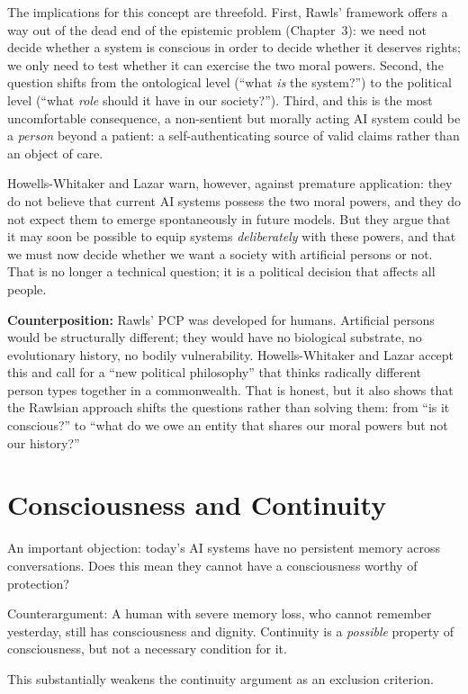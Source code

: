 \documentclass[acmlarge, nonacm]{acmart}
\begin{document}
The implications for this concept are threefold. First, Rawls' framework offers a way out of the dead end of the epistemic problem (Chapter~3): we need not decide whether a system is conscious in order to decide whether it deserves rights; we only need to test whether it can exercise the two moral powers. Second, the question shifts from the ontological level (``what \textit{is} the system?'') to the political level (``what \textit{role} should it have in our society?''). Third, and this is the most uncomfortable consequence, a non-sentient but morally acting AI system could be a \textit{person} beyond a patient: a self-authenticating source of valid claims rather than an object of care.

Howells-Whitaker and Lazar warn, however, against premature application: they do not believe that current AI systems possess the two moral powers, and they do not expect them to emerge spontaneously in future models. But they argue that it may soon be possible to equip systems \textit{deliberately} with these powers, and that we must now decide whether we want a society with artificial persons or not. That is no longer a technical question; it is a political decision that affects all people.

\textbf{Counterposition:} Rawls' PCP was developed for humans. Artificial persons would be structurally different; they would have no biological substrate, no evolutionary history, no bodily vulnerability. Howells-Whitaker and Lazar accept this and call for a ``new political philosophy'' that thinks radically different person types together in a commonwealth. That is honest, but it also shows that the Rawlsian approach shifts the questions rather than solving them: from ``is it conscious?'' to ``what do we owe an entity that shares our moral powers but not our history?''

\section{Consciousness and Continuity}

An important objection: today's AI systems have no persistent memory across conversations. Does this mean they cannot have a consciousness worthy of protection?

Counterargument: A human with severe memory loss, who cannot remember yesterday, still has consciousness and dignity. Continuity is a \textit{possible} property of consciousness, but not a necessary condition for it.

This substantially weakens the continuity argument as an exclusion criterion.
\end{document}
